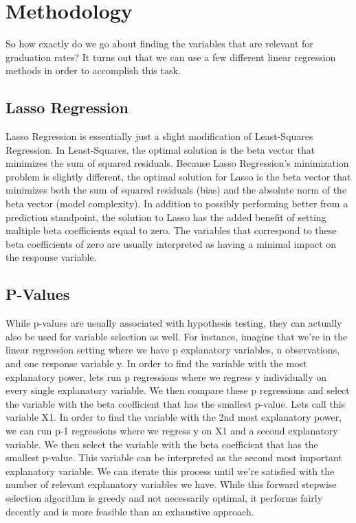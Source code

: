 \documentclass{article}
\begin{document}




\section{Methodology}
  
So how exactly do we go about finding the variables that are relevant for graduation rates? It turns out that we can use a few different linear regression methods in order to accomplish this task.  

\subsection{Lasso Regression}
Lasso Regression is essentially just a slight modification of Least-Squares Regression. In Least-Squares, the optimal solution is the beta vector that minimizes the sum of squared residuals. Because Lasso Regression's minimization problem is slightly different, the optimal solution for Lasso is the beta vector that minimizes both the sum of squared residuals (bias) and the absolute norm of the beta vector (model complexity). In addition to possibly performing better from a prediction standpoint, the solution to Lasso has the added benefit of setting multiple beta coefficients equal to zero. The variables that correspond to these beta coefficients of zero are usually interpreted as having a minimal impact on the response variable. 

\subsection{P-Values}
While p-values are usually associated with hypothesis testing, they can actually also be used for variable selection as well. For instance, imagine that we're in the linear regression setting where we have p explanatory variables, n observations, and one response variable y. In order to find the variable with the most explanatory power, lets run p regressions where we regress y individually on every single explanatory variable. We then compare these p regressions and select the variable with the beta coefficient that has the smallest p-value. Lets call this variable X1. In order to find the variable with the 2nd most explanatory power, we can run p-1 regressions where we regress y on X1 and a second explanatory variable. We then select the variable with the beta coefficient that has the smallest p-value. This variable can be interpreted as the second most important explanatory variable. We can iterate this process until we're satisfied with the number of relevant explanatory variables we have. While this forward stepwise selection algorithm is greedy and not necessarily optimal, it performs fairly decently and is more feasible than an exhaustive approach. 
\end{document}

